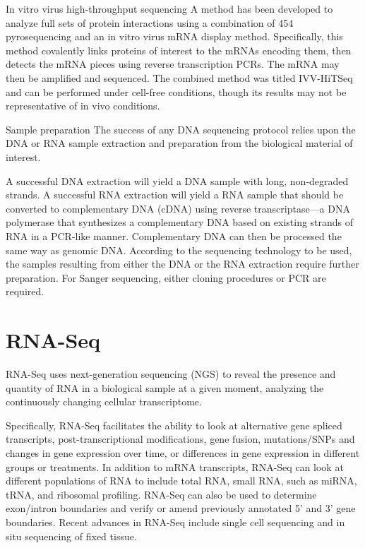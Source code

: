 In vitro virus high-throughput sequencing
A method has been developed to analyze full sets of protein interactions using a combination of 454 pyrosequencing and an in vitro virus mRNA display method. Specifically, this method covalently links proteins of interest to the mRNAs encoding them, then detects the mRNA pieces using reverse transcription PCRs. The mRNA may then be amplified and sequenced. The combined method was titled IVV-HiTSeq and can be performed under cell-free conditions, though its results may not be representative of in vivo conditions.

Sample preparation
The success of any DNA sequencing protocol relies upon the DNA or RNA sample extraction and preparation from the biological material of interest.

A successful DNA extraction will yield a DNA sample with long, non-degraded strands.
A successful RNA extraction will yield a RNA sample that should be converted to complementary DNA (cDNA) using reverse transcriptase---a DNA polymerase that synthesizes a complementary DNA based on existing strands of RNA in a PCR-like manner. Complementary DNA can then be processed the same way as genomic DNA.
According to the sequencing technology to be used, the samples resulting from either the DNA or the RNA extraction require further preparation. For Sanger sequencing, either cloning procedures or PCR are required.

\hypertarget{rna-seq}{%
\section{RNA-Seq}\label{rna-seq}}

RNA-Seq uses next-generation sequencing (NGS) to reveal the presence and quantity of RNA in a biological sample at a given moment, analyzing the continuously changing cellular transcriptome.

Specifically, RNA-Seq facilitates the ability to look at alternative gene spliced transcripts, post-transcriptional modifications, gene fusion, mutations/SNPs and changes in gene expression over time, or differences in gene expression in different groups or treatments. In addition to mRNA transcripts, RNA-Seq can look at different populations of RNA to include total RNA, small RNA, such as miRNA, tRNA, and ribosomal profiling. RNA-Seq can also be used to determine exon/intron boundaries and verify or amend previously annotated 5' and 3' gene boundaries. Recent advances in RNA-Seq include single cell sequencing and in situ sequencing of fixed tissue.

